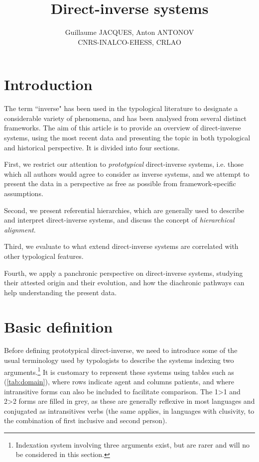 \documentclass[twoside,a4paper,11pt]{article}
\begin{document}
\title{Direct-inverse systems} 

\author{Guillaume JACQUES, Anton ANTONOV\\ CNRS-INALCO-EHESS, CRLAO}

\maketitle
 \section{Introduction}
 
 The  term ``inverse" has been used in the typological literature to designate a considerable variety of phenomena, and has been analysed from several distinct frameworks.  The aim of this article is to provide an overview of direct-inverse systems, using the most recent data and presenting the topic in both typological and historical perspective. It  is divided into four sections.
 
  First, we restrict our attention to \textit{prototypical} direct-inverse systems, i.e. those which all authors would agree to consider as inverse systems, and we attempt to present the data in a perspective as free as possible from framework-specific assumptions.
 
 Second, we present referential hierarchies, which are generally used to describe and interpret direct-inverse systems, and discuss the concept of \textit{hierarchical alignment}. 
 
 Third, we evaluate to what extend direct-inverse systems  are correlated with other typological features. 
 
 Fourth, we apply a panchronic perspective on direct-inverse systems, studying their attested origin and their evolution, and how the diachronic pathways can help understanding the present data.

\section{Basic definition} \label{sec:definition}

Before defining prototypical direct-inverse, we need to introduce some of the usual terminology used by typologists  to describe the systems indexing two arguments.\footnote{Indexation system involving three arguments exist, but are rarer and will no be considered in this section.} It is customary to represent these systems using tables such as  (\ref{tab:domain}), where rows indicate agent and columns patients, and where intransitive forms can also be included to facilitate comparison. The 1>1 and 2>2 forms are filled in grey, as these are generally reflexive in most languages and conjugated as intransitives verbs (the same applies, in languages with clusivity, to the combination of first inclusive and second person). 
\end{document}

